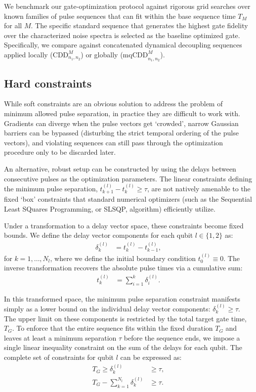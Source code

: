 \documentclass[%
 reprint,
superscriptaddress,
 amsmath,amssymb,
 aps,
pra,
]{revtex4-2}
\begin{document}
We benchmark our gate-optimization protocol against rigorous grid searches over known families of pulse sequences that can fit within the base sequence time $T_M$ for all $M$. The specific standard sequence that generates the highest gate fidelity over the characterized noise spectra is selected as the baseline optimized gate. Specifically, we compare against concatenated dynamical decoupling sequences applied locally ($\text{CDD}_{n_1,n_2}^M$) or globally ($\text{mqCDD}_{n_1,n_2}^M$).

\subsection{Hard constraints}
While soft constraints are an obvious solution to address the problem of minimum allowed pulse separation, in practice they are difficult to work with. Gradients can diverge when the pulse vectors get `crowded', narrow Gaussian barriers can be bypassed (disturbing the strict temporal ordering of the pulse vectors), and violating sequences can still pass through the optimization procedure only to be discarded later.

An alternative, robust setup can be constructed by using the delays between consecutive pulses as the optimization parameters. The linear constraints defining the minimum pulse separation, $t_{k+1}^{(l)} - t_k^{(l)} \geq \tau$, are not natively amenable to the fixed `box' constraints that standard numerical optimizers (such as the Sequential Least SQuares Programming, or SLSQP, algorithm) efficiently utilize.

Under a transformation to a delay vector space, these constraints become fixed bounds. We define the delay vector components for each qubit $l \in \{1, 2\}$ as:
\begin{align}
    \delta_k^{(l)} &= t_k^{(l)} - t_{k-1}^{(l)},
\end{align}
for $k=1, \dots, N_l$, where we define the initial boundary condition $t_0^{(l)} \equiv 0$. The inverse transformation recovers the absolute pulse times via a cumulative sum:
\begin{align}
    t_k^{(l)} &= \sum_{i=1}^k \delta_i^{(l)}.
\end{align}

In this transformed space, the minimum pulse separation constraint manifests simply as a lower bound on the individual delay vector components: $\delta_k^{(l)} \geq \tau$. The upper limit on these components is restricted by the total target gate time, $T_G$. To enforce that the entire sequence fits within the fixed duration $T_G$ and leaves at least a minimum separation $\tau$ before the sequence ends, we impose a single linear inequality constraint on the sum of the delays for each qubit. The complete set of constraints for qubit $l$ can be expressed as:
\begin{align}
    T_G \geq \delta_k^{(l)} &\geq \tau, \\
    T_G - \sum_{k=1}^{N_l} \delta_k^{(l)} &\geq \tau.
\end{align}
\end{document}
